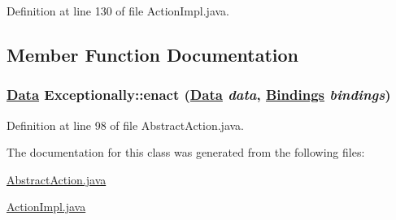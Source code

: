 Definition at line 130 of file Action\-Impl.java.

\subsection{Member Function Documentation}
\hypertarget{classExceptionally_a1}{
\subsubsection[enact]{\setlength{\rightskip}{0pt plus 5cm}\hyperlink{interfaceData}{Data} Exceptionally::enact (\hyperlink{interfaceData}{Data} {\em data}, \hyperlink{interfaceBindings}{Bindings} {\em bindings})}}
\label{classExceptionally_a1}




Definition at line 98 of file Abstract\-Action.java.

The documentation for this class was generated from the following files:\begin{CompactItemize}
\item 
\hyperlink{AbstractAction_8java-source}{Abstract\-Action.java}\item 
\hyperlink{ActionImpl_8java-source}{Action\-Impl.java}\end{CompactItemize}
